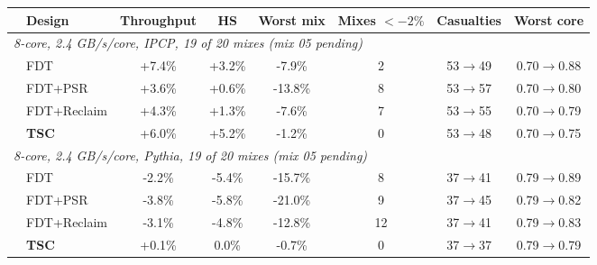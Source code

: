 \begin{tabular}{llcccccc}
\toprule
& Design & Throughput & HS & Worst mix & Mixes $<-2\%$ & Casualties & Worst core \\
\midrule
\multicolumn{8}{l}{\emph{8-core, 2.4 GB/s/core, IPCP, 19 of 20 mixes (mix 05 pending)}} \\
& FDT & +7.4\% & +3.2\% & -7.9\% & 2 & 53$\to$49 & 0.70$\to$0.88 \\
& FDT+PSR & +3.6\% & +0.6\% & -13.8\% & 8 & 53$\to$57 & 0.70$\to$0.80 \\
& FDT+Reclaim & +4.3\% & +1.3\% & -7.6\% & 7 & 53$\to$55 & 0.70$\to$0.79 \\
& \textbf{TSC} & +6.0\% & +5.2\% & -1.2\% & 0 & 53$\to$48 & 0.70$\to$0.75 \\
\midrule
\multicolumn{8}{l}{\emph{8-core, 2.4 GB/s/core, Pythia, 19 of 20 mixes (mix 05 pending)}} \\
& FDT & -2.2\% & -5.4\% & -15.7\% & 8 & 37$\to$41 & 0.79$\to$0.89 \\
& FDT+PSR & -3.8\% & -5.8\% & -21.0\% & 9 & 37$\to$45 & 0.79$\to$0.82 \\
& FDT+Reclaim & -3.1\% & -4.8\% & -12.8\% & 12 & 37$\to$41 & 0.79$\to$0.83 \\
& \textbf{TSC} & +0.1\% & 0.0\% & -0.7\% & 0 & 37$\to$37 & 0.79$\to$0.79 \\
\bottomrule
\end{tabular}
